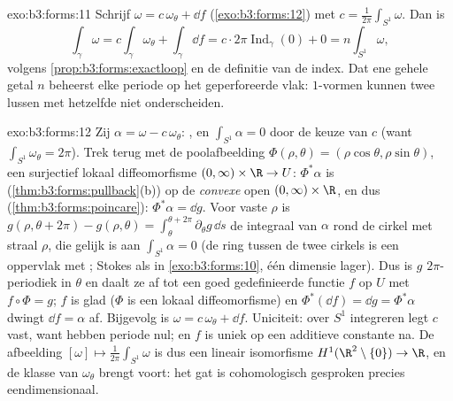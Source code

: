 \begin{solution}{exo:b3:forms:11}
Schrijf $\omega = c\,\omega_\theta + \dd f$
(\cref{exo:b3:forms:12}) met $c = \frac1{2\pi}\int_{S^1}\omega$.
Dan is
\[
\int_\gamma\omega = c\int_\gamma\omega_\theta +
\int_\gamma\dd f
= c\cdot2\pi\operatorname{Ind}_\gamma(0) + 0
= n\int_{S^1}\omega,
\]
volgens \cref{prop:b3:forms:exactloop} en de definitie van de
index. Dat ene gehele getal $n$ beheerst elke periode op het
geperforeerde vlak:  $1$-vormen kunnen twee lussen met
hetzelfde  niet onderscheiden.
\end{solution}

\begin{solution}{exo:b3:forms:12}
Zij $\alpha = \omega - c\,\omega_\theta$: , en
$\int_{S^1}\alpha = 0$ door de keuze van $c$ (want
$\int_{S^1}\omega_\theta = 2\pi$). Trek terug met de
poolafbeelding $\Phi(\rho, \theta) = (\rho\cos\theta,
\rho\sin\theta)$, een surjectief lokaal diffeomorfisme $(0,
\infty)\times\R \to U$: $\Phi^*\alpha$ is 
(\cref{thm:b3:forms:pullback}(b)) op de \emph{convexe} open
$(0,\infty)\times\R$, en dus 
(\cref{thm:b3:forms:poincare}): $\Phi^*\alpha = \dd g$. Voor
vaste $\rho$ is $g(\rho, \theta + 2\pi) - g(\rho, \theta) =
\int_\theta^{\theta + 2\pi}\partial_\theta g\,\dd s$ de integraal
van $\alpha$ rond de cirkel met straal $\rho$, die gelijk is aan
$\int_{S^1}\alpha = 0$ (de ring tussen de twee cirkels is een
 oppervlak met ; Stokes als in
\cref{exo:b3:forms:10}, één dimensie lager). Dus is $g$
$2\pi$-periodiek in $\theta$ en daalt ze af tot een goed
gedefinieerde functie $f$ op $U$ met $f\circ\Phi = g$; $f$ is
glad ($\Phi$ is een lokaal diffeomorfisme) en $\Phi^*(\dd f) =
\dd g = \Phi^*\alpha$ dwingt $\dd f = \alpha$ af. Bijgevolg is
$\omega = c\,\omega_\theta + \dd f$. Uniciteit: over $S^1$
integreren legt $c$ vast, want  hebben periode nul;
en $f$ is uniek op een additieve constante na. De afbeelding
$[\omega] \mapsto \frac1{2\pi}\int_{S^1}\omega$ is dus een
lineair isomorfisme $H^1(\R^2\setminus\{0\}) \to \R$, en de
klasse van $\omega_\theta$ brengt voort: het gat is
cohomologisch gesproken precies eendimensionaal.
\end{solution}

